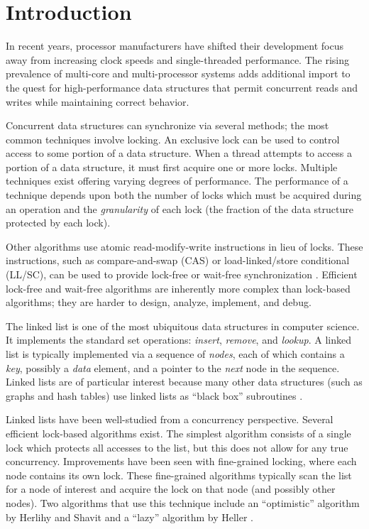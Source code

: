 \documentclass{llncs}
\begin{document}
\section{Introduction}

In recent years, processor manufacturers have shifted their 
development focus away from increasing clock speeds and
single-threaded performance.  The rising prevalence of
multi-core and multi-processor systems adds additional import
to the quest for high-performance data structures that permit
concurrent reads and writes while maintaining correct
behavior.

Concurrent data structures can synchronize via several
methods; the most common techniques involve locking.  An
exclusive lock can
be used to control access to some portion of a data structure.
When a thread attempts
to access a portion of a data structure, it must first acquire
one or more locks.  Multiple techniques exist offering varying
degrees of performance.  The performance of a technique depends
upon both the number of locks which must be acquired
during an operation and the {\em granularity} of each lock
(the fraction of the data structure protected by each lock).

Other algorithms use atomic read-modify-write instructions
in lieu of locks.  These instructions, such as compare-and-swap (CAS) or
load-linked/store conditional (LL/SC), can be used to provide lock-free
or wait-free synchronization {\cite{Herlihy:Progress}}. Efficient lock-free and
wait-free algorithms are inherently more complex than lock-based algorithms;
they are harder to design, analyze, implement, and debug. 

The linked list is one of the most ubiquitous data structures in
computer science.  It implements the standard set operations:
{\em insert}, {\em remove}, and {\em lookup}.  A linked list is typically
implemented via a sequence of {\em nodes}, each of which contains a
{\em key}, possibly a {\em data} element, and a pointer to the {\em next}
node in the sequence.  Linked lists are of particular interest because
many other data structures (such as graphs and
hash tables) use linked lists as ``black box'' subroutines
\cite{Cormen:Algorithms}.

Linked lists have been well-studied from a concurrency perspective.
Several efficient lock-based algorithms exist.  The simplest algorithm
consists of a single lock which protects all accesses to the list,
but this does not allow for any true concurrency.  Improvements
have been seen with fine-grained locking, where each node contains
its own lock.  These fine-grained algorithms typically scan the
list for a node of interest and acquire the lock
on that node (and possibly other nodes). Two algorithms that use this technique
include an ``optimistic'' algorithm by Herlihy and Shavit
{\cite{Herlihy:TAOMP}} and a ``lazy'' algorithm by Heller 
{\cite{Heller:LazyList}}.
\end{document}
